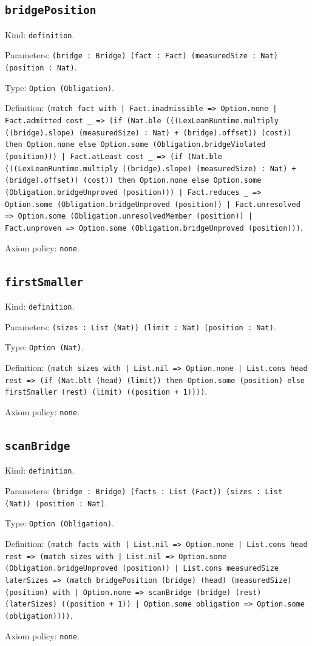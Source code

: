 \documentclass[11pt]{article}
\begin{document}
\subsection*{\texttt{bridgePosition}}
\noindent Kind: \texttt{definition}.\par
\noindent Parameters: \texttt{(bridge : Bridge) (fact : Fact) (measuredSize : Nat) (position : Nat)}.\par
\noindent Type: \texttt{Option (Obligation)}.\par
\noindent Definition: \texttt{(match fact with | Fact.inadmissible => Option.none | Fact.admitted cost \_ => (if (Nat.ble (((LexLeanRuntime.multiply ((bridge).slope) (measuredSize) : Nat) + (bridge).offset)) (cost)) then Option.none else Option.some (Obligation.bridgeViolated (position))) | Fact.atLeast cost \_ => (if (Nat.ble (((LexLeanRuntime.multiply ((bridge).slope) (measuredSize) : Nat) + (bridge).offset)) (cost)) then Option.none else Option.some (Obligation.bridgeUnproved (position))) | Fact.reduces \_ => Option.some (Obligation.bridgeUnproved (position)) | Fact.unresolved => Option.some (Obligation.unresolvedMember (position)) | Fact.unproven => Option.some (Obligation.bridgeUnproved (position)))}.\par
\noindent Axiom policy: \texttt{none}.\par
\subsection*{\texttt{firstSmaller}}
\noindent Kind: \texttt{definition}.\par
\noindent Parameters: \texttt{(sizes : List (Nat)) (limit : Nat) (position : Nat)}.\par
\noindent Type: \texttt{Option (Nat)}.\par
\noindent Definition: \texttt{(match sizes with | List.nil => Option.none | List.cons head rest => (if (Nat.blt (head) (limit)) then Option.some (position) else firstSmaller (rest) (limit) ((position + 1))))}.\par
\noindent Axiom policy: \texttt{none}.\par
\subsection*{\texttt{scanBridge}}
\noindent Kind: \texttt{definition}.\par
\noindent Parameters: \texttt{(bridge : Bridge) (facts : List (Fact)) (sizes : List (Nat)) (position : Nat)}.\par
\noindent Type: \texttt{Option (Obligation)}.\par
\noindent Definition: \texttt{(match facts with | List.nil => Option.none | List.cons head rest => (match sizes with | List.nil => Option.some (Obligation.bridgeUnproved (position)) | List.cons measuredSize laterSizes => (match bridgePosition (bridge) (head) (measuredSize) (position) with | Option.none => scanBridge (bridge) (rest) (laterSizes) ((position + 1)) | Option.some obligation => Option.some (obligation))))}.\par
\noindent Axiom policy: \texttt{none}.\par
\end{document}
